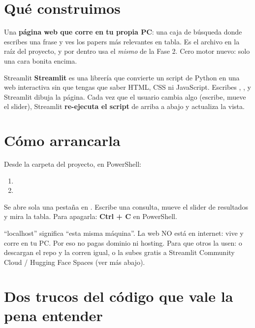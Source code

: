 \documentclass[11pt,a4paper]{article}
\begin{document}
\section{Qué construimos}

Una \textbf{página web que corre en tu propia PC}: una caja de búsqueda donde escribes una
frase y ves los papers más relevantes en tabla. Es el archivo  en la raíz del
proyecto, y por dentro usa el \emph{mismo}  de la Fase 2. Cero motor
nuevo: solo una cara bonita encima.

\begin{concepto}{Streamlit}
\textbf{Streamlit} es una librería que convierte un script de Python en una web interactiva
sin que tengas que saber HTML, CSS ni JavaScript. Escribes ,
,  y Streamlit dibuja la página. Cada
vez que el usuario cambia algo (escribe, mueve el slider), Streamlit \textbf{re-ejecuta el
script} de arriba a abajo y actualiza la vista.
\end{concepto}

\section{Cómo arrancarla}

\begin{practica}
Desde la carpeta del proyecto, en PowerShell:
\begin{enumerate}
  \item {}
  \item {}
\end{enumerate}
Se abre sola una pestaña en . Escribe una consulta, mueve el
slider de resultados y mira la tabla. Para apagarla: \textbf{Ctrl + C} en PowerShell.
\end{practica}

\begin{ojo}
``localhost'' significa ``esta misma máquina''. La web NO está en internet: vive y corre en tu
PC. Por eso no pagas dominio ni hosting. Para que otros la usen: o descargan el repo y la corren
igual, o la subes gratis a Streamlit Community Cloud / Hugging Face Spaces (ver más abajo).
\end{ojo}

\section{Dos trucos del código que vale la pena entender}
\end{document}
